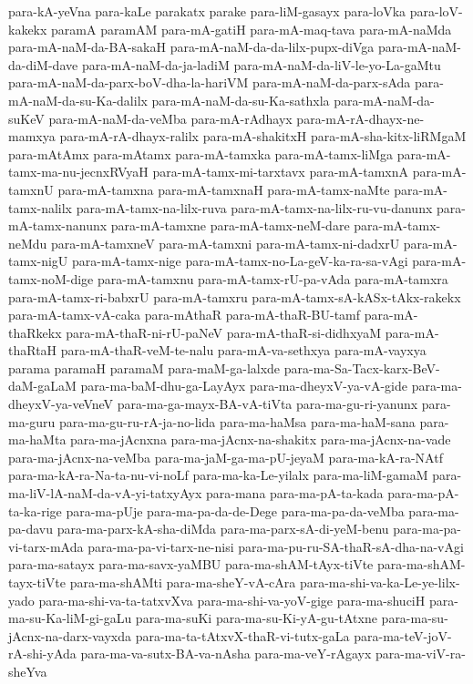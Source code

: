 {para-kA-yeVna
para-kaLe
parakatx
parake
para-liM-gasayx
para-loVka
para-loV-kakekx
paramA
paramAM
para-mA-gatiH
para-mA-maq-tava
para-mA-naMda
para-mA-naM-da-BA-sakaH
para-mA-naM-da-da-lilx-pupx-diVga
para-mA-naM-da-diM-dave
para-mA-naM-da-ja-ladiM
para-mA-naM-da-liV-le-yo-La-gaMtu
para-mA-naM-da-parx-boV-dha-la-hariVM
para-mA-naM-da-parx-sAda
para-mA-naM-da-su-Ka-dalilx
para-mA-naM-da-su-Ka-sathxla
para-mA-naM-da-suKeV
para-mA-naM-da-veMba
para-mA-rAdhayx
para-mA-rA-dhayx-ne-mamxya
para-mA-rA-dhayx-ralilx
para-mA-shakitxH
para-mA-sha-kitx-liRMgaM
para-mAtAmx
para-mAtamx
para-mA-tamxka
para-mA-tamx-liMga
para-mA-tamx-ma-nu-jecnxRVyaH
para-mA-tamx-mi-tarxtavx
para-mA-tamxnA
para-mA-tamxnU
para-mA-tamxna
para-mA-tamxnaH
para-mA-tamx-naMte
para-mA-tamx-nalilx
para-mA-tamx-na-lilx-ruva
para-mA-tamx-na-lilx-ru-vu-danunx
para-mA-tamx-nanunx
para-mA-tamxne
para-mA-tamx-neM-dare
para-mA-tamx-neMdu
para-mA-tamxneV
para-mA-tamxni
para-mA-tamx-ni-dadxrU
para-mA-tamx-nigU
para-mA-tamx-nige
para-mA-tamx-no-La-geV-ka-ra-sa-vAgi
para-mA-tamx-noM-dige
para-mA-tamxnu
para-mA-tamx-rU-pa-vAda
para-mA-tamxra
para-mA-tamx-ri-babxrU
para-mA-tamxru
para-mA-tamx-sA-kASx-tAkx-rakekx
para-mA-tamx-vA-caka
para-mAthaR
para-mA-thaR-BU-tamf
para-mA-thaRkekx
para-mA-thaR-ni-rU-paNeV
para-mA-thaR-si-didhxyaM
para-mA-thaRtaH
para-mA-thaR-veM-te-nalu
para-mA-va-sethxya
para-mA-vayxya
parama
paramaH
paramaM
para-maM-ga-lalxde
para-ma-Sa-Tacx-karx-BeV-daM-gaLaM
para-ma-baM-dhu-ga-LayAyx
para-ma-dheyxV-ya-vA-gide
para-ma-dheyxV-ya-veVneV
para-ma-ga-mayx-BA-vA-tiVta
para-ma-gu-ri-yanunx
para-ma-guru
para-ma-gu-ru-rA-ja-no-lida
para-ma-haMsa
para-ma-haM-sana
para-ma-haMta
para-ma-jAcnxna
para-ma-jAcnx-na-shakitx
para-ma-jAcnx-na-vade
para-ma-jAcnx-na-veMba
para-ma-jaM-ga-ma-pU-jeyaM
para-ma-kA-ra-NAtf
para-ma-kA-ra-Na-ta-nu-vi-noLf
para-ma-ka-Le-yilalx
para-ma-liM-gamaM
para-ma-liV-lA-naM-da-vA-yi-tatxyAyx
para-mana
para-ma-pA-ta-kada
para-ma-pA-ta-ka-rige
para-ma-pUje
para-ma-pa-da-de-Dege
para-ma-pa-da-veMba
para-ma-pa-davu
para-ma-parx-kA-sha-diMda
para-ma-parx-sA-di-yeM-benu
para-ma-pa-vi-tarx-mAda
para-ma-pa-vi-tarx-ne-nisi
para-ma-pu-ru-SA-thaR-sA-dha-na-vAgi
para-ma-satayx
para-ma-savx-yaMBU
para-ma-shAM-tAyx-tiVte
para-ma-shAM-tayx-tiVte
para-ma-shAMti
para-ma-sheY-vA-cAra
para-ma-shi-va-ka-Le-ye-lilx-yado
para-ma-shi-va-ta-tatxvXva
para-ma-shi-va-yoV-gige
para-ma-shuciH
para-ma-su-Ka-liM-gi-gaLu
para-ma-suKi
para-ma-su-Ki-yA-gu-tAtxne
para-ma-su-jAcnx-na-darx-vayxda
para-ma-ta-tAtxvX-thaR-vi-tutx-gaLa
para-ma-teV-joV-rA-shi-yAda
para-ma-va-sutx-BA-va-nAsha
para-ma-veY-rAgayx
para-ma-viV-ra-sheYva
}
